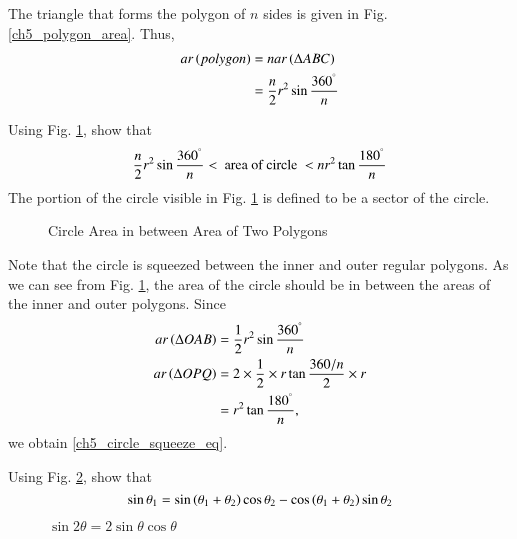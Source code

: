 \proof The triangle that forms the polygon of $n$ sides is given in Fig. \ref{ch5_polygon_area}.  Thus,
%
\begin{equation}
\begin{split}
ar\left(polygon\right) &= n ar\left(\Delta ABC\right) \\
&= \frac{n}{2}r^{2}\sin\frac{360^{\degree}}{n}
\end{split}
\end{equation}
%
\begin{problem}
	Using Fig. \ref{ch5_circle_squeeze}, show that
%
\begin{equation}
\label{ch5_circle_squeeze_eq}
\frac{n}{2}r^{2}\sin\frac{360^{\degree}}{n} < \text{ area of circle } < nr^{2}\tan\frac{180^{\degree}}{n}
\end{equation}
%
The portion of the circle visible in Fig. \ref{ch5_circle_squeeze} is defined to be a sector of the circle.
\end{problem}
\begin{figure}[!ht]
	\begin{center}
		
		\resizebox{\columnwidth}{!}{}
	\end{center}
	\caption{Circle Area in between Area of Two Polygons}
	\label{ch5_circle_squeeze}	
\end{figure}
%

\proof Note that the circle is squeezed between the inner and outer regular polygons.  As we can see from Fig. \ref{ch5_circle_squeeze}, the area of the circle should be in between the areas of the inner and outer polygons.  Since
%
\begin{align}
ar \left(\Delta OAB\right) &= \frac{1}{2}r^{2}\sin\frac{360^{\degree}}{n} \\
ar \left(\Delta OPQ\right) &= 2 \times \frac{1}{2} \times r \tan\frac{360/n}{2} \times r \\
&= r^{2}\tan\frac{180^{\degree}}{n},
\end{align}
%
we obtain \eqref{ch5_circle_squeeze_eq}.
%
%
\begin{problem}
	Using Fig. \ref{ch5_sin_theta}, show that 
\begin{equation}
\label{ch5_sin_theta_eq}
\sin  \theta_1 = \sin \left(\theta_1 + \theta_2\right)\cos \theta_2 - \cos\left(\theta_1+\theta_2\right)\sin\theta_2
\end{equation}	
\end{problem}
\begin{figure}[!ht]
	\begin{center}
		
		\resizebox{\columnwidth}{!}{}
	\end{center}
	\caption{$\sin2\theta = 2\sin\theta\cos\theta$}
	\label{ch5_sin_theta}	
\end{figure}
%

